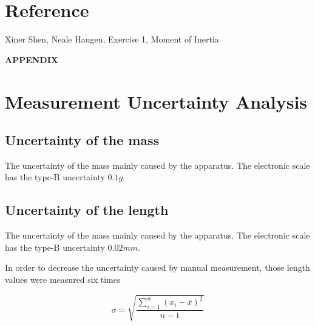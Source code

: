 \documentclass[12pt,a4paper]{article}
\begin{document}
\section{Reference}
Xiner Shen, Neale Haugen, Exercise 1, Moment of Inertia

\newpage
{\LARGE\textbf{APPENDIX}}
\setcounter{section}{0}
\renewcommand\thesection{\Alph{section}}

\section {Measurement Uncertainty Analysis}

\subsection{Uncertainty of the mass}

The uncertainty of the mass mainly caused by the apparatus. The electronic scale has the type-B uncertainty $0.1g$.\par

\subsection{Uncertainty of the length}

The uncertainty of the mass mainly caused by the apparatus. The electronic scale has the type-B uncertainty $0.02mm$.\par

In order to decrease the uncertainty caused by manual measurement, those length values were measured six times \par 

$$\sigma=\sqrt{\frac{\sum_{i=1}^n(x_i-\overline{x})^2}{n-1}}$$ \par

\newcommand{\tabincell}[2]{\begin{tabular}{@{}#1@{}}#2\end{tabular}}
\end{document}

